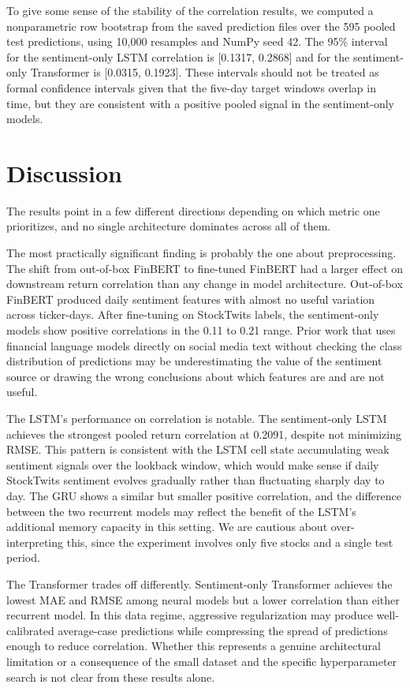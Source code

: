 \documentclass[10pt,twocolumn]{article}
\begin{document}
To give some sense of the stability of the correlation results, we computed a nonparametric row bootstrap from the saved prediction files over the 595 pooled test predictions, using 10{,}000 resamples and NumPy seed 42. The 95\% interval for the sentiment-only LSTM correlation is [0.1317, 0.2868] and for the sentiment-only Transformer is [0.0315, 0.1923]. These intervals should not be treated as formal confidence intervals given that the five-day target windows overlap in time, but they are consistent with a positive pooled signal in the sentiment-only models.

\section{Discussion}

The results point in a few different directions depending on which metric one prioritizes, and no single architecture dominates across all of them.

The most practically significant finding is probably the one about preprocessing. The shift from out-of-box FinBERT to fine-tuned FinBERT had a larger effect on downstream return correlation than any change in model architecture. Out-of-box FinBERT produced daily sentiment features with almost no useful variation across ticker-days. After fine-tuning on StockTwits labels, the sentiment-only models show positive correlations in the 0.11 to 0.21 range. Prior work that uses financial language models directly on social media text without checking the class distribution of predictions may be underestimating the value of the sentiment source or drawing the wrong conclusions about which features are and are not useful.

The LSTM's performance on correlation is notable. The sentiment-only LSTM achieves the strongest pooled return correlation at 0.2091, despite not minimizing RMSE. This pattern is consistent with the LSTM cell state accumulating weak sentiment signals over the lookback window, which would make sense if daily StockTwits sentiment evolves gradually rather than fluctuating sharply day to day. The GRU shows a similar but smaller positive correlation, and the difference between the two recurrent models may reflect the benefit of the LSTM's additional memory capacity in this setting. We are cautious about over-interpreting this, since the experiment involves only five stocks and a single test period.

The Transformer trades off differently. Sentiment-only Transformer achieves the lowest MAE and RMSE among neural models but a lower correlation than either recurrent model. In this data regime, aggressive regularization may produce well-calibrated average-case predictions while compressing the spread of predictions enough to reduce correlation. Whether this represents a genuine architectural limitation or a consequence of the small dataset and the specific hyperparameter search is not clear from these results alone.
\end{document}
